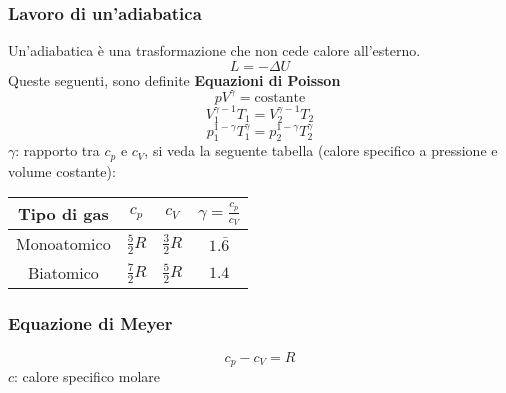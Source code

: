 \subsubsection{Lavoro di un'adiabatica}
Un'adiabatica è una trasformazione che non cede calore all'esterno.
\begin{equation*}
L = -\Delta U
\end{equation*}
Queste seguenti, sono definite \textbf{Equazioni di Poisson}
\begin{equation*}
pV^\gamma = \text{costante}
\end{equation*}
\begin{equation*}
V_1^{\gamma-1}T_1 = V_2^{\gamma-1}T_2
\end{equation*}
\begin{equation*}
p_1^{1-\gamma}T_1^\gamma = p_2^{1-\gamma}T_2^\gamma
\end{equation*}
$\gamma$: rapporto tra $c_p$ e $c_V$, si veda la seguente tabella (calore specifico a pressione e
volume costante):
\begin{center}
  \begin{tabular}{c | c | c | c}
    Tipo di gas & $c_p$ & $c_V$ & $\gamma=\frac{c_p}{c_V}$\\ \hline
    Monoatomico & $\frac{5}{2}R$ & $\frac{3}{2}R$ & $1.\bar{6}$\\ \hline
    Biatomico & $\frac{7}{2}R$ & $\frac{5}{2}R$ & $1.4$\\
  \end{tabular}
\end{center}

\subsubsection{Equazione di Meyer}
\begin{equation*}
c_p - c_V = R
\end{equation*}
$c$: calore specifico molare

